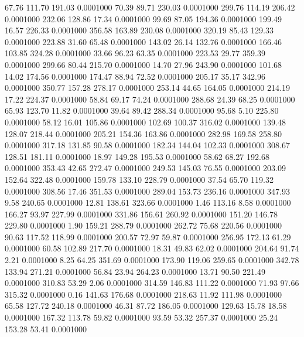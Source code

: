   67.76  111.70  191.03   0.0001000
  70.39   89.71  230.03   0.0001000
 299.76  114.19  206.42   0.0001000
 232.06  128.86   17.34   0.0001000
  99.69   87.05  194.36   0.0001000
 199.49   16.57  226.33   0.0001000
 356.58  163.89  230.08   0.0001000
 320.19   85.43  129.33   0.0001000
 223.88   31.60   65.48   0.0001000
 143.02   26.14  132.76   0.0001000
 166.46  103.85  324.28   0.0001000
  33.66   96.23   63.35   0.0001000
 223.53   29.77  359.39   0.0001000
 299.66   80.44  215.70   0.0001000
  14.70   27.96  243.90   0.0001000
 101.68   14.02  174.56   0.0001000
 174.47   88.94   72.52   0.0001000
 205.17   35.17  342.96   0.0001000
 350.77  157.28  278.17   0.0001000
 253.14   44.65  164.05   0.0001000
 214.19   17.22  224.37   0.0001000
  58.84   69.17   74.24   0.0001000
 288.68   24.39   68.25   0.0001000
  65.93  123.70   11.82   0.0001000
  39.64   89.42  288.34   0.0001000
  95.68    5.10  225.80   0.0001000
  58.12   16.01  105.86   0.0001000
 102.69  100.37  316.02   0.0001000
 139.48  128.07  218.44   0.0001000
 205.21  154.36  163.86   0.0001000
 282.98  169.58  258.80   0.0001000
 317.18  131.85   90.58   0.0001000
 182.34  144.04  102.33   0.0001000
 308.67  128.51  181.11   0.0001000
  18.97  149.28  195.53   0.0001000
  58.62   68.27  192.68   0.0001000
 353.43   42.65  272.47   0.0001000
 249.53  145.03   76.55   0.0001000
 203.09  152.64  322.48   0.0001000
 159.78  133.10  228.79   0.0001000
  37.54   65.70  119.32   0.0001000
 308.56   17.46  351.53   0.0001000
 289.04  153.73  236.16   0.0001000
 347.93    9.58  240.65   0.0001000
  12.81  138.61  323.66   0.0001000
   1.46  113.16    8.58   0.0001000
 166.27   93.97  227.99   0.0001000
 331.86  156.61  260.92   0.0001000
 151.20  146.78  229.80   0.0001000
   1.90  159.21  288.79   0.0001000
 262.72   75.68  220.56   0.0001000
  90.63  117.52  118.99   0.0001000
 200.57   72.97   59.87   0.0001000
 256.95  172.13   61.29   0.0001000
  60.58  102.89  217.70   0.0001000
  18.31   49.83   62.02   0.0001000
 204.64   91.74    2.21   0.0001000
   8.25   64.25  351.69   0.0001000
 173.90  119.06  259.65   0.0001000
 342.78  133.94  271.21   0.0001000
  56.84   23.94  264.23   0.0001000
  13.71   90.50  221.49   0.0001000
 310.83   53.29    2.06   0.0001000
 314.59  146.83  111.22   0.0001000
  71.93   97.66  315.32   0.0001000
   0.16  141.63  176.68   0.0001000
 218.63   11.92  111.98   0.0001000
  65.58  127.72  240.18   0.0001000
  46.31   87.72  186.05   0.0001000
 129.63   15.78   18.58   0.0001000
 167.32  113.78   59.82   0.0001000
  93.59   53.32  257.37   0.0001000
  25.24  153.28   53.41   0.0001000
